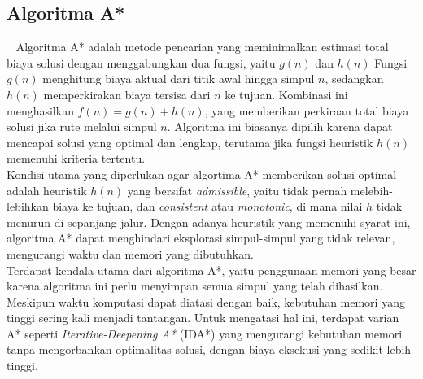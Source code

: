 \subsection{Algoritma A*}
\label{a*}
~\cite{Russell:09:ai}
Algoritma A* adalah metode pencarian yang meminimalkan estimasi total biaya solusi dengan menggabungkan dua fungsi, yaitu  
$g(n)$ dan $h(n)$ Fungsi $g(n)$ menghitung biaya aktual dari titik awal hingga simpul $n$, sedangkan $h(n)$ memperkirakan biaya tersisa dari $n$ ke tujuan. Kombinasi ini menghasilkan $f(n) = g(n) + h(n)$, yang memberikan perkiraan total biaya solusi jika rute melalui simpul $n$. Algoritma ini biasanya dipilih karena dapat mencapai solusi yang optimal dan lengkap, terutama jika fungsi heuristik $h(n)$ memenuhi kriteria tertentu.
\\
Kondisi utama yang diperlukan agar algortima A* memberikan solusi optimal adalah heuristik $h(n)$ yang bersifat \textit{admissible}, yaitu tidak pernah melebih-lebihkan biaya ke tujuan, dan \textit{consistent} atau \textit{monotonic}, di mana nilai $h$ tidak menurun di sepanjang jalur. Dengan adanya heuristik yang memenuhi syarat ini, algoritma A* dapat menghindari eksplorasi simpul-simpul yang tidak relevan, mengurangi waktu dan memori yang dibutuhkan.
\\
Terdapat kendala utama dari algoritma A*, yaitu penggunaan memori yang besar karena algoritma ini perlu menyimpan semua simpul yang telah dihasilkan. Meskipun waktu komputasi dapat diatasi dengan baik, kebutuhan memori yang tinggi sering kali menjadi tantangan. Untuk mengatasi hal ini, terdapat varian A* seperti \textit{Iterative-Deepening A*} (IDA*) yang mengurangi kebutuhan memori tanpa mengorbankan optimalitas solusi, dengan biaya eksekusi yang sedikit lebih tinggi.